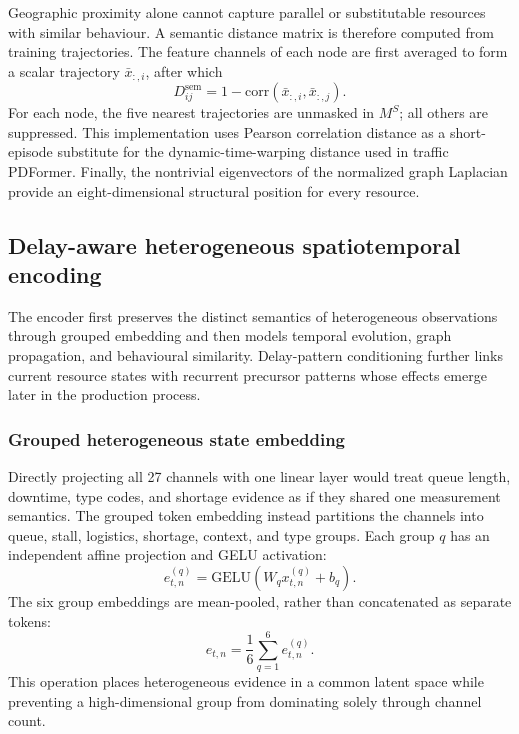 \documentclass[a4paper,fleqn]{cas-dc}
\begin{document}
Geographic proximity alone cannot capture parallel or substitutable resources with similar behaviour. A semantic distance matrix is therefore computed from training trajectories. The feature channels of each node are first averaged to form a scalar trajectory $\bar x_{:,i}$, after which
\begin{equation}
D^{\mathrm{sem}}_{ij}
=1-\mathrm{corr}(\bar{x}_{:,i},\bar{x}_{:,j}).
\end{equation}
For each node, the five nearest trajectories are unmasked in $M^S$; all others are suppressed. This implementation uses Pearson correlation distance as a short-episode substitute for the dynamic-time-warping distance used in traffic PDFormer. Finally, the nontrivial eigenvectors of the normalized graph Laplacian provide an eight-dimensional structural position for every resource.


\subsection{Delay-aware heterogeneous spatiotemporal encoding}

The encoder first preserves the distinct semantics of heterogeneous observations through grouped embedding and then models temporal evolution, graph propagation, and behavioural similarity. Delay-pattern conditioning further links current resource states with recurrent precursor patterns whose effects emerge later in the production process.


\subsubsection{Grouped heterogeneous state embedding}

Directly projecting all 27 channels with one linear layer would treat queue length, downtime, type codes, and shortage evidence as if they shared one measurement semantics. The grouped token embedding instead partitions the channels into queue, stall, logistics, shortage, context, and type groups. Each group $q$ has an independent affine projection and GELU activation:
\begin{equation}
e^{(q)}_{t,n}=\mathrm{GELU}
\left(W_q x^{(q)}_{t,n}+b_q\right).
\end{equation}
The six group embeddings are mean-pooled, rather than concatenated as separate tokens:
\begin{equation}
e_{t,n}=\frac{1}{6}\sum_{q=1}^{6}e^{(q)}_{t,n}.
\end{equation}
This operation places heterogeneous evidence in a common latent space while preventing a high-dimensional group from dominating solely through channel count.
\end{document}
